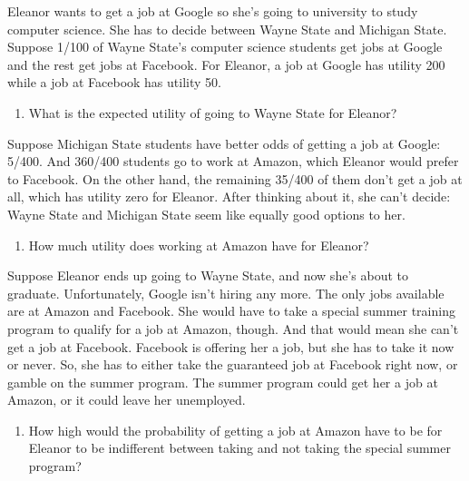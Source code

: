 \documentclass[
  11pt,
]{article}
\providecommand{\tightlist}{%
  \setlength{\itemsep}{0pt}\setlength{\parskip}{0pt}}
\begin{document}
Eleanor wants to get a job at Google so she's going to university to
study computer science. She has to decide between Wayne State and
Michigan State. Suppose 1/100 of Wayne State's computer science students
get jobs at Google and the rest get jobs at Facebook. For Eleanor, a job
at Google has utility 200 while a job at Facebook has utility 50.

\begin{enumerate}
\def\labelenumi{\arabic{enumi}.}
\setcounter{enumi}{11}
\tightlist
\item
  What is the expected utility of going to Wayne State for Eleanor?
\end{enumerate}

Suppose Michigan State students have better odds of getting a job at
Google: 5/400. And 360/400 students go to work at Amazon, which Eleanor
would prefer to Facebook. On the other hand, the remaining 35/400 of
them don't get a job at all, which has utility zero for Eleanor. After
thinking about it, she can't decide: Wayne State and Michigan State seem
like equally good options to her.

\begin{enumerate}
\def\labelenumi{\arabic{enumi}.}
\setcounter{enumi}{12}
\tightlist
\item
  How much utility does working at Amazon have for Eleanor?
\end{enumerate}

Suppose Eleanor ends up going to Wayne State, and now she's about to
graduate. Unfortunately, Google isn't hiring any more. The only jobs
available are at Amazon and Facebook. She would have to take a special
summer training program to qualify for a job at Amazon, though. And that
would mean she can't get a job at Facebook. Facebook is offering her a
job, but she has to take it now or never. So, she has to either take the
guaranteed job at Facebook right now, or gamble on the summer program.
The summer program could get her a job at Amazon, or it could leave her
unemployed.

\begin{enumerate}
\def\labelenumi{\arabic{enumi}.}
\setcounter{enumi}{13}
\tightlist
\item
  How high would the probability of getting a job at Amazon have to be
  for Eleanor to be indifferent between taking and not taking the
  special summer program?
\end{enumerate}
\end{document}
